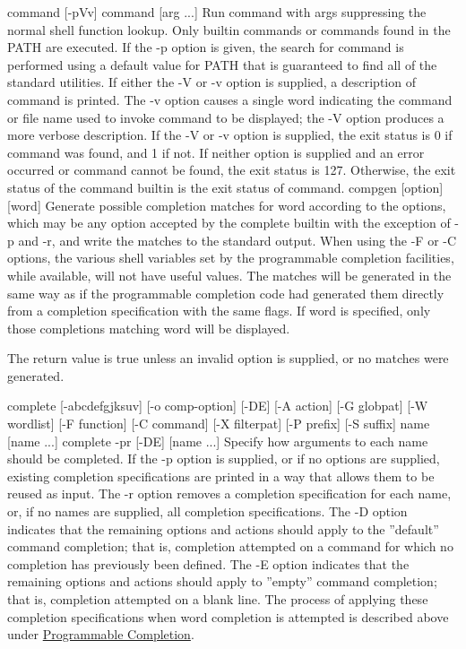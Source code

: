 \begin{longtable}
command [-pVv] command [arg ...]
Run command with args suppressing the normal shell function lookup. Only builtin commands or commands found in the PATH are executed. If the -p option is given, the search for command is performed using a default value for PATH that is guaranteed to find all of the standard utilities. If either the -V or -v option is supplied, a description of command is printed. The -v option causes a single word indicating the command or file name used to invoke command to be displayed; the -V option produces a more verbose description. If the -V or -v option is supplied, the exit status is 0 if command was found, and 1 if not. If neither option is supplied and an error occurred or command cannot be found, the exit status is 127. Otherwise, the exit status of the command builtin is the exit status of command.
compgen [option] [word]
Generate possible completion matches for word according to the options, which may be any option accepted by the complete builtin with the exception of -p and -r, and write the matches to the standard output. When using the -F or -C options, the various shell variables set by the programmable completion facilities, while available, will not have useful values.
The matches will be generated in the same way as if the programmable completion code had generated them directly from a completion specification with the same flags. If word is specified, only those completions matching word will be displayed.

The return value is true unless an invalid option is supplied, or no matches were generated.

complete [-abcdefgjksuv] [-o comp-option] [-DE] [-A action] [-G globpat] [-W wordlist] [-F function] [-C command]
[-X filterpat] [-P prefix] [-S suffix] name [name ...]
complete -pr [-DE] [name ...]
Specify how arguments to each name should be completed. If the -p option is supplied, or if no options are supplied, existing completion specifications are printed in a way that allows them to be reused as input. The -r option removes a completion specification for each name, or, if no names are supplied, all completion specifications. The -D option indicates that the remaining options and actions should apply to the ''default'' command completion; that is, completion attempted on a command for which no completion has previously been defined. The -E option indicates that the remaining options and actions should apply to ''empty'' command completion; that is, completion attempted on a blank line.
The process of applying these completion specifications when word completion is attempted is described above under \hyperref[sec:programmablecompletion]{Programmable Completion}.

\end{longtable}

